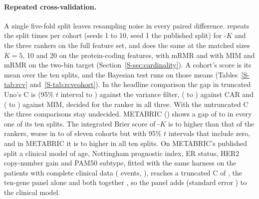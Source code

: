 \paragraph{Repeated cross-validation.} A single five-fold split leaves resampling noise in
every paired difference.  repeats the split \SuppRcvSplits{}
times per cohort (seeds 1 to 10, seed 1 the published split) for -$K$ and the
three rankers on the full feature set, and  does the same at the
matched sizes $K = 5$, 10 and 20 on the protein-coding features, with mRMR and with MIM
and mRMR on the two-bin target (Section~\ref{S-sec:cardinality}). A cohort's score is its
mean over the ten splits, and the Bayesian test runs on those means
(Tables~\ref{S-tab:rcv} and~\ref{S-tab:rcvcohort}). In the headline comparison the gap in
truncated Uno's C is \SuppGapVar{} (95\% $t$ interval \SuppGapLoVar{} to \SuppGapHiVar)
against the variance filter, \SuppGapCar{} (\SuppGapLoCar{} to \SuppGapHiCar) against CAR
and \SuppGapMim{} (\SuppGapLoMim{} to \SuppGapHiMim) against MIM, decided for the ranker in
all three. With the untruncated C the three comparisons stay undecided. METABRIC
() shows a gap of \SuppMetabricGapMin{} to
\SuppMetabricGapMax{} in every one of its ten splits. The integrated Brier score of
-$K$ is \SuppIbsGapMin{} to \SuppIbsGapMax{} higher than that of the rankers, worse
in \SuppIbsWorseMin{} to \SuppIbsWorseMax{} of eleven cohorts but with 95\% $t$ intervals
that include zero, and in METABRIC it is \SuppMetabricIbsMin{} to \SuppMetabricIbsMax{}
higher in all ten splits. On METABRIC's published split a
clinical model of age, Nottingham prognostic index, ER status, HER2 copy-number gain and
PAM50 subtype, fitted with the same harness on the \SuppClinN{} patients with complete
clinical data (\SuppClinEvents{} events, ), reaches a truncated C
of \SuppClinC, the ten-gene panel alone \SuppClinPanelC{} and both together \SuppClinBothC,
so the panel adds \SuppClinAdd{} (standard error \SuppClinAddSe) to the clinical model.

\begin{table}[htbp]
\centering\footnotesize
\caption{Headline comparison over ten five-fold splits:  in top-$K$ mode
against the rankers at the ten-percent cut-off, on the cohort means over the splits.
Difference: mean paired difference,  minus the rival, with its standard error
over the eleven cohorts. Cohorts: cohorts favouring  and the rival. The next
three columns are the posterior probabilities of the Bayesian signed-rank test, in bold
above 0.95. Splits: splits in which the same comparison, analysed on that split alone,
reaches the same verdict. The integrated Brier score (lower is better) has no region of
practical equivalence and is shown without the test.}
\label{S-tab:rcv}

\end{table}

